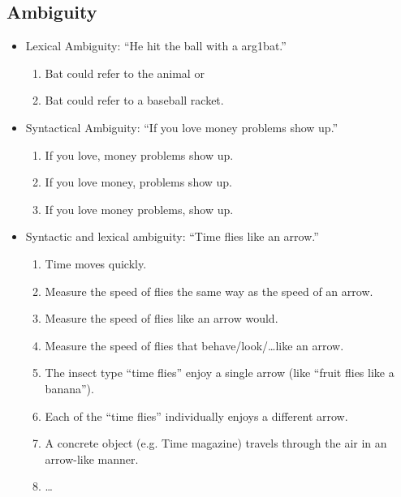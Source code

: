 \documentclass[a4paper, 11pt, accentcolor = tud3b]{tudreport}
\providecommand{\ambiguity}[1]{\textcolor{ambiguityorange}{#1}}
\begin{document}
            \subsection{Ambiguity} %
            	\begin{itemize}
            		\item Lexical Ambiguity: \enquote{He hit the ball with a \ambiguity{arg1}{bat}.}
	            		\begin{enumerate}
	            			\item \ambiguity{Bat} could refer to the animal or
	            			\item \ambiguity{Bat} could refer to a baseball racket.
	            		\end{enumerate}
            		\item Syntactical Ambiguity: \enquote{If you love money problems show up.}
       					\begin{enumerate}
       						\item \ambiguity{If you love}, money problems show up.
       						\item \ambiguity{If you love money}, problems show up.
       						\item \ambiguity{If you love money problems}, show up.
       					\end{enumerate}
            		\item Syntactic and lexical ambiguity: \enquote{Time flies like an arrow.}
       					\begin{enumerate}
       						\item Time moves quickly.
       						\item Measure the speed of flies the same way as the speed of an arrow.
       						\item Measure the speed of flies like an arrow would.
       						\item Measure the speed of flies that behave/look/\dots like an arrow.
       						\item The insect type \enquote{time flies} enjoy a single arrow (like \enquote{fruit flies like a banana}).
       						\item Each of the \enquote{time flies} individually enjoys a different arrow.
       						\item A concrete object (e.g. Time magazine) travels through the air in an arrow-like manner.
       						\item \dots
       					\end{enumerate}
            	\end{itemize}
\end{document}
